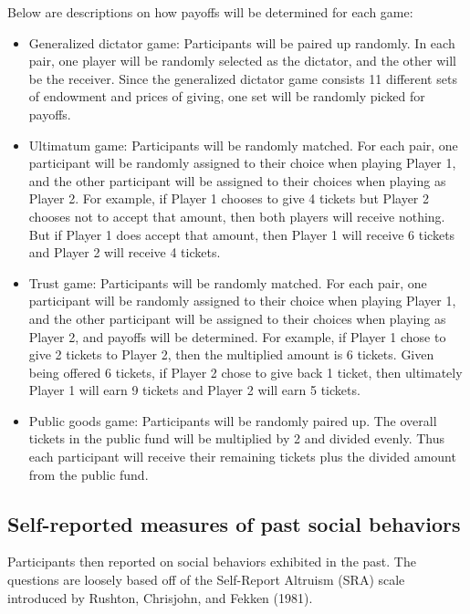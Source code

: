 \documentclass[12pt]{article}
\begin{document}
Below are descriptions on how payoffs will be determined for each game: 

\begin{itemize}

\item Generalized dictator game: Participants will be paired up randomly. In each pair, one player will be randomly selected as the dictator, and the other will be the receiver.  Since the generalized dictator game consists 11 different sets of endowment and prices of giving, one set will be randomly picked for payoffs.

\item Ultimatum game: Participants will be randomly matched. For each pair, one participant will be randomly assigned to their choice when playing Player 1, and the other participant will be assigned to their choices when playing as Player 2. For example, if Player 1 chooses to give 4 tickets but Player 2 chooses not to accept that amount, then both players will receive nothing. But if Player 1 does accept that amount, then Player 1 will receive 6 tickets and Player 2 will receive 4 tickets.

\item Trust game: Participants will be randomly matched. For each pair, one participant will be randomly assigned to their choice when playing Player 1, and the other participant will be assigned to their choices when playing as Player 2, and payoffs will be determined. For example, if Player 1 chose to give 2 tickets to Player 2, then the multiplied amount is 6 tickets. Given being offered 6 tickets, if Player 2 chose to give back 1 ticket, then ultimately Player 1 will earn 9 tickets and Player 2 will earn 5 tickets.

\item Public goods game: Participants will be randomly paired up. The overall tickets in the public fund will be multiplied by 2 and divided evenly. Thus each participant will receive their remaining tickets plus the divided amount from the public fund.

\end{itemize}

\subsection{Self-reported measures of past social behaviors}

Participants then reported on social behaviors exhibited in the past. The questions are loosely based off of the Self-Report Altruism (SRA) scale introduced by Rushton, Chrisjohn, and Fekken (1981). 
\end{document}
